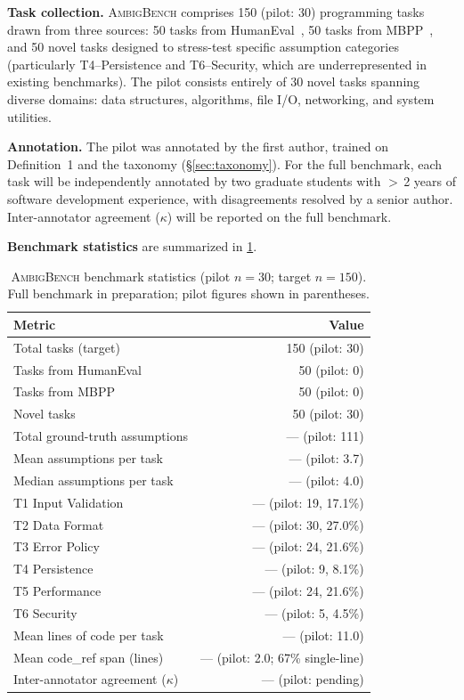 \documentclass[sigconf,review,anonymous]{acmart}
\newcommand{\benchname}{\textsc{AmbigBench}\xspace}
\newcommand{\NumBenchmarkTasks}{150 (pilot: 30)\xspace}
\begin{document}
\textbf{Task collection.}  \benchname comprises \NumBenchmarkTasks programming tasks
drawn from three sources: 50 tasks from HumanEval~\cite{chen2021codex},
50 tasks from MBPP~\cite{austin2021mbpp}, and 50 novel tasks
designed to stress-test specific assumption categories (particularly T4–Persistence
and T6–Security, which are underrepresented in existing benchmarks).
The pilot consists entirely of 30 novel tasks spanning diverse domains:
data structures, algorithms, file I/O, networking, and system utilities.

\textbf{Annotation.}  The pilot was annotated by the first author,
trained on Definition~1 and the taxonomy (\S\ref{sec:taxonomy}).
For the full benchmark, each task will be independently annotated by two graduate
students with $>$\,2 years of software development experience, with disagreements
resolved by a senior author.  Inter-annotator agreement ($\kappa$) will be
reported on the full benchmark.

\textbf{Benchmark statistics} are summarized in \cref{tab:benchstats}.

\begin{table}[t]
\caption{\benchname benchmark statistics (pilot $n=30$; target $n=150$).
         Full benchmark in preparation; pilot figures shown in parentheses.}
\label{tab:benchstats}
\small
\begin{tabular}{@{}lr@{}}
\toprule
\textbf{Metric} & \textbf{Value} \\
\midrule
Total tasks (target)                    & 150 (pilot: 30) \\
Tasks from HumanEval                    & 50 (pilot: 0) \\
Tasks from MBPP                         & 50 (pilot: 0) \\
Novel tasks                             & 50 (pilot: 30) \\
\midrule
Total ground-truth assumptions          & — (pilot: 111) \\
Mean assumptions per task               & — (pilot: 3.7) \\
Median assumptions per task             & — (pilot: 4.0) \\
\midrule
T1 Input Validation                     & — (pilot: 19, 17.1\%) \\
T2 Data Format                          & — (pilot: 30, 27.0\%) \\
T3 Error Policy                         & — (pilot: 24, 21.6\%) \\
T4 Persistence                          & — (pilot: 9, 8.1\%) \\
T5 Performance                          & — (pilot: 24, 21.6\%) \\
T6 Security                             & — (pilot: 5, 4.5\%) \\
\midrule
Mean lines of code per task             & — (pilot: 11.0) \\
Mean code\_ref span (lines)            & — (pilot: 2.0; 67\% single-line) \\
Inter-annotator agreement ($\kappa$)    & — (pilot: pending) \\
\bottomrule
\end{tabular}
\end{table}
\end{document}
